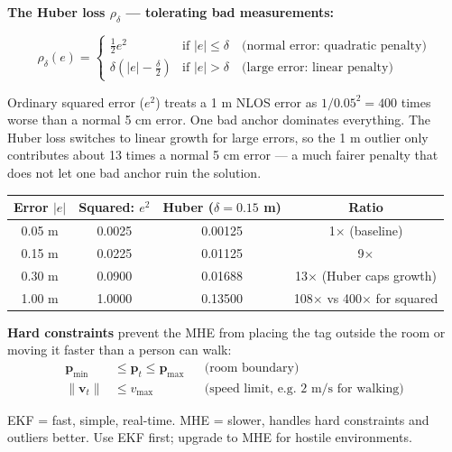 \documentclass[11pt,a4paper]{article}
\newcommand{\vect}[1]{\bm{#1}}
\begin{document}
\textbf{The Huber loss $\rho_\delta$ --- tolerating bad measurements:}

\begin{equation}
\rho_\delta(e) = \begin{cases}
\tfrac{1}{2}e^2 & \text{if } |e| \leq \delta \quad \text{(normal error: quadratic penalty)} \\[4pt]
\delta\!\left(|e| - \tfrac{\delta}{2}\right) & \text{if } |e| > \delta \quad \text{(large error: linear penalty)}
\end{cases}
\label{eq:huber}
\end{equation}

\begin{plain}
Ordinary squared error ($e^2$) treats a 1 m NLOS error as $1/0.05^2 = 400$ times worse than a normal 5 cm error. One bad anchor dominates everything. The Huber loss switches to linear growth for large errors, so the 1 m outlier only contributes about 13 times a normal 5 cm error --- a much fairer penalty that does not let one bad anchor ruin the solution.
\end{plain}

\begin{center}
\begin{tabular}{cccc}
\toprule
\textbf{Error $|e|$} & \textbf{Squared: $e^2$} & \textbf{Huber ($\delta=0.15$ m)} & \textbf{Ratio} \\
\midrule
0.05 m & 0.0025 & 0.00125 & 1$\times$ (baseline) \\
0.15 m & 0.0225 & 0.01125 & 9$\times$ \\
0.30 m & 0.0900 & 0.01688 & 13$\times$ (Huber caps growth) \\
1.00 m & 1.0000 & 0.13500 & 108$\times$ vs 400$\times$ for squared \\
\bottomrule
\end{tabular}
\end{center}

\textbf{Hard constraints} prevent the MHE from placing the tag outside the room or moving it faster than a person can walk:
\begin{align}
\vect{p}_{\min} &\leq \vect{p}_t \leq \vect{p}_{\max} && \text{(room boundary)} \\
\|\vect{v}_t\| &\leq v_{\max} && \text{(speed limit, e.g.\ 2 m/s for walking)}
\end{align}

\begin{takeaway}
EKF = fast, simple, real-time. MHE = slower, handles hard constraints and outliers better. Use EKF first; upgrade to MHE for hostile environments.
\end{takeaway}
\end{document}
